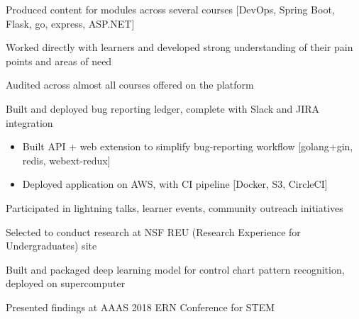 \documentclass[letterpaper]{deedy-resume} %
\begin{document}
\begin{minipage}[t]{1.0\textwidth}
\sectionspace %



\begin{tightitemize}
\item Produced content for modules across several courses [DevOps, Spring Boot, Flask, go, express, ASP.NET]
\item Worked directly with learners and developed strong understanding of their pain points and areas of need
\item Audited across almost all courses offered on the platform
\item Built and deployed bug reporting ledger, complete with Slack and JIRA integration
  \begin{itemize}
  \item Built API + web extension to simplify bug-reporting workflow [golang+gin, redis, webext-redux]
  \item Deployed application on AWS, with CI pipeline [Docker, S3, CircleCI]
  \end{itemize}
\item Participated in lightning talks, learner events, community outreach initiatives
\end{tightitemize}

\sectionspace %



\begin{tightitemize}
\item Selected to conduct research at NSF REU (Research Experience for Undergraduates) site
\item Built and packaged deep learning model for control chart pattern recognition, deployed on supercomputer
\item Presented findings at AAAS 2018 ERN Conference for STEM
\end{tightitemize}

\sectionspace %



\end{minipage}
\end{document}
